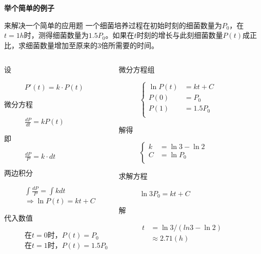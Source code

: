 \documentclass[presentation]{beamer}
\begin{document}
\begin{CJK*}{UTF8}{gbsn}
\begin{frame}{\textbf{举个简单的例子}}
\begin{exampleblock}{来解决一个简单的应用题}
一个细菌培养过程在初始时刻的细菌数量为$P_0$，在$t=1h$时，测得细菌数量为$1.5P_0$。如果在$t$时刻的增长与此刻细菌数量$P(t)$成正比，求细菌数量增加至原来的3倍所需要的时间。
\end{exampleblock}

\begin{columns}
\begin{description}
 \item[设] $P'(t) = k \cdot P(t)$ 
 \item[微分方程] $\frac{{dP}}{{dt}} = kP(t)$
 \item[即]  $\frac{{dP}}{{P}} = k \cdot dt$
 \item[两边积分] $\int {\frac{{dP}}{P} = \int {kdt} } $\\
 $ \Rightarrow \ln P(t) = kt + C$
 \item[代入数值] 在$t=0$时，$P(t)=P_0$\\
 在$t=1$时，$P(t)=1.5P_0$
\end{description}
\begin{description}
	 \item[微分方程组] $
	 \left\{
	 \begin{aligned}
	 \ln P(t) &= kt + C \\
	 P(0)&=P_0 \\
	 P(1)&=1.5P_0 \\
	 \end{aligned}
	 \right.
	 $
	 \item[解得] $
	 \left\{
	 \begin{aligned}
	 k&=\ln 3-\ln 2 \\
	 C&=\ln P_0 \\
	 \end{aligned}
	 \right.
	 $
	 \item[求解方程] $\ln 3P_0 = kt + C$
	 \item[解] $ 
	 \begin{aligned}
	 t&=\ln 3/(ln3 - \ln 2) \\
	  & \approx 2.71 (h)
	 \end{aligned}$
\end{description}
\end{columns}
\end{frame}


\end{CJK*}
\end{document}
